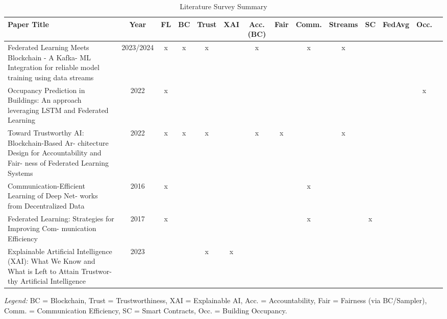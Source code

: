\begin{table}
\scriptsize
\centering
\caption{Literature Survey Summary}
\label{tab:lit_survey_summary}
\begin{adjustbox}{width=\textwidth,center}
\begin{tabular}{|@{}p{}|c|*{12}{c|}@{}} %
    \toprule
    \textbf{Paper Title} &
    \textbf{Year} &
    \textbf{FL} &
    \textbf{BC} &
    \textbf{Trust} &
    \textbf{XAI} &
    \textbf{Acc. (BC)} &
    \textbf{Fair} &
    \textbf{Comm.} &
    \textbf{Streams} &
    \textbf{SC} &
    \textbf{FedAvg} &
    \textbf{Occ.} \\
    \midrule
   
     
    Federated Learning Meets Blockchain - A Kafka-
ML Integration for reliable model training using
data streams &
    2023/2024 & x & x & x &   & x &   & x & x &   &   &   \\
    \midrule
    Occupancy Prediction in Buildings: An approach
leveraging LSTM and Federated Learning &
    2022 & x &   &   &   &   &   &   &   &   &   & x \\
    \midrule
    Toward Trustworthy AI: Blockchain-Based Ar-
chitecture Design for Accountability and Fair-
ness of Federated Learning Systems &
    2022 & x & x & x &   & x & x &   & x &   &   &   \\
    \midrule
    Communication-Efficient Learning of Deep Net-
works from Decentralized Data &
    2016 & x &   &   &   &   &   & x &   &   &   &   \\
    \midrule
    Federated Learning: Strategies for Improving Com-
munication Efficiency &
    2017 & x &   &   &   &   &   & x &   & x &   &   \\
    \midrule
    Explainable Artificial Intelligence (XAI): What
We Know and What is Left to Attain Trustwor-
thy Artificial Intelligence &
    2023 &   &   & x & x &   &   &   &   &   &   &   \\
        \toprule
\end{tabular}
\end{adjustbox}

\end{table}

\noindent\textit{Legend:} BC = Blockchain, Trust = Trustworthiness, XAI = Explainable AI, Acc. = Accountability, Fair = Fairness (via BC/Sampler), Comm. = Communication Efficiency, SC = Smart Contracts, Occ. = Building Occupancy.





